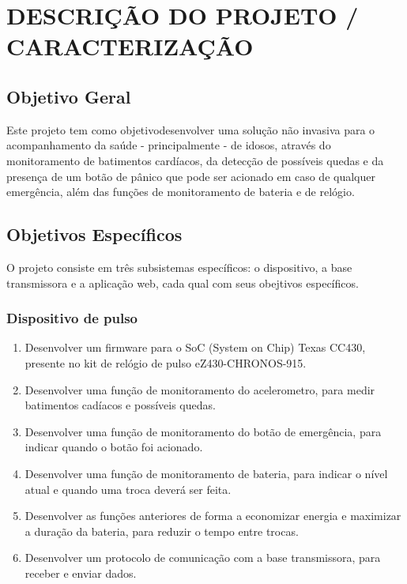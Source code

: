 \documentclass[a4paper]{article}
\begin{document}
\section{DESCRIÇÃO DO PROJETO / CARACTERIZAÇÃO}

\subsection{Objetivo Geral}
Este projeto tem como objetivodesenvolver uma solução não invasiva para o acompanhamento da saúde - principalmente - de idosos, através do monitoramento de batimentos cardíacos, da detecção de possíveis quedas e da presença de um botão de pânico que pode ser acionado em caso de qualquer emergência, além das funções de monitoramento de bateria e de relógio. 

\subsection{Objetivos Específicos}
O projeto consiste em três subsistemas específicos: o dispositivo, a base transmissora e a aplicação web, cada qual com seus obejtivos específicos.

\subsubsection{Dispositivo de pulso}
\begin{enumerate}
\item Desenvolver um firmware para o SoC (System on Chip) Texas CC430, presente no kit de relógio de pulso eZ430-CHRONOS-915.
\item Desenvolver uma função de monitoramento do acelerometro, para medir batimentos cadíacos e possíveis quedas.
\item Desenvolver uma função de monitoramento do botão de emergência, para indicar quando o botão foi acionado.
\item Desenvolver uma função de monitoramento de bateria, para indicar o nível atual e quando uma troca deverá ser feita.
\item Desenvolver as funções anteriores de forma a economizar energia e maximizar a duração da bateria, para reduzir o tempo entre trocas.
\item Desenvolver um protocolo de comunicação com a base transmissora, para receber e enviar dados. 
\end{enumerate}

\end{document}
